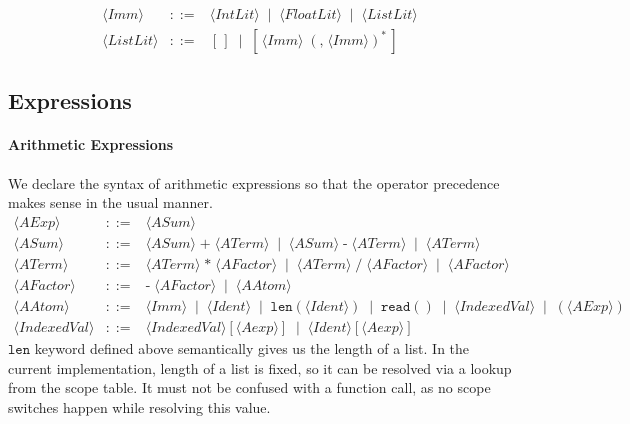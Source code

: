 \documentclass{article}
\begin{document}
\[
\begin{array}{rcl}
\langle \mathit{Imm} \rangle
&::=&
\langle \mathit{IntLit} \rangle
\;\mid\;
\langle \mathit{FloatLit} \rangle
\;\mid\;
\langle \mathit{ListLit} \rangle \\[4pt]

\langle \mathit{ListLit} \rangle
&::=&
[\,]
\;\mid\;
[\,\langle \mathit{Imm} \rangle\;(\texttt{,}\;\langle \mathit{Imm} \rangle)^*\,]
\end{array}
\]

\subsection{Expressions}

\paragraph{Arithmetic Expressions} 
We declare the syntax of arithmetic expressions so that the operator precedence makes sense in the usual manner.
\[
\begin{array}{rcl}
\langle \mathit{AExp} \rangle
&::=&
\langle \mathit{ASum} \rangle \\[4pt]

\langle \mathit{ASum} \rangle
&::=&
\langle \mathit{ASum} \rangle\;\texttt{+}\;\langle \mathit{ATerm} \rangle
\;\mid\;
\langle \mathit{ASum} \rangle\;\texttt{-}\;\langle \mathit{ATerm} \rangle
\;\mid\;
\langle \mathit{ATerm} \rangle \\[4pt]

\langle \mathit{ATerm} \rangle
&::=&
\langle \mathit{ATerm} \rangle\;\texttt{*}\;\langle \mathit{AFactor} \rangle
\;\mid\;
\langle \mathit{ATerm} \rangle\;\texttt{/}\;\langle \mathit{AFactor} \rangle
\;\mid\;
\langle \mathit{AFactor} \rangle \\[4pt]

\langle \mathit{AFactor} \rangle
&::=&
\texttt{-}\;\langle \mathit{AFactor} \rangle
\;\mid\;
\langle \mathit{AAtom} \rangle \\[4pt]

\langle \mathit{AAtom} \rangle
&::=&
\langle \mathit{Imm} \rangle
\;\mid\;
\langle \mathit{Ident} \rangle
\;\mid\;
\mathtt{len}(\langle \mathit{Ident} \rangle)
\;\mid\;
\mathtt{read()} 
\;\mid\;
\langle \mathit{IndexedVal} \rangle
\;\mid\;
(\langle \mathit{AExp} \rangle) \\[4pt]

\langle \mathit{IndexedVal} \rangle
&::=&
\langle \mathit{IndexedVal} \rangle [\langle \mathit{Aexp} \rangle]
\;\mid\;
\langle \mathit{Ident} \rangle [\langle \mathit{Aexp} \rangle]
\end{array}
\]
$\mathtt{len}$ keyword defined above semantically gives us the length of a list. In the current implementation, length of a list is fixed, so it can be resolved via a lookup from the scope table. It must not be confused with a function call, as no scope switches happen while resolving this value.
\end{document}
